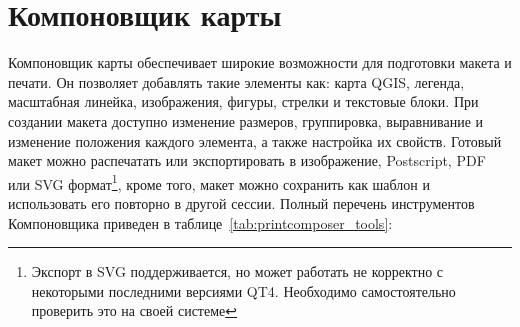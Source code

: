 
\chapter{Компоновщик карты}\label{label_printcomposer}


Компоновщик карты обеспечивает широкие возможности для подготовки макета
и печати. Он позволяет добавлять такие элементы как: карта QGIS, легенда,
масштабная линейка, изображения, фигуры, стрелки и текстовые блоки. При
создании макета доступно изменение размеров, группировка, выравнивание и
изменение положения каждого элемента, а также настройка их свойств.
Готовый макет можно распечатать или экспортировать в изображение,
Postscript, PDF или SVG формат\footnote{Экспорт в SVG поддерживается,
но может работать не корректно с некоторыми последними версиями QT4.
Необходимо самостоятельно проверить это на своей системе}, кроме того,
макет можно сохранить как шаблон и использовать его повторно в другой
сессии. Полный перечень инструментов Компоновщика приведен в
таблице~\ref{tab:printcomposer_tools}:


